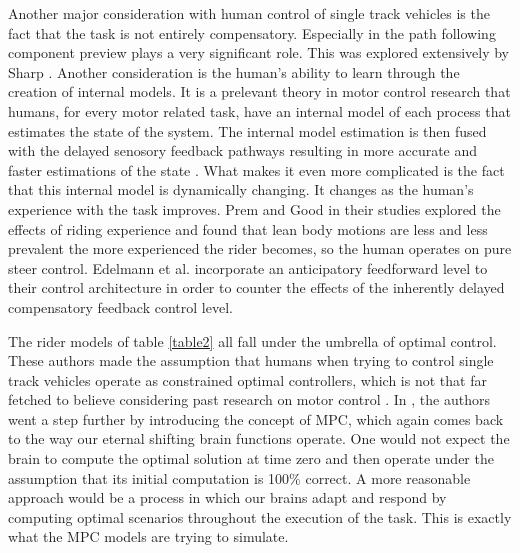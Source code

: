 Another major consideration with human control of single track vehicles is the fact that the task is not entirely compensatory. Especially in the path following component preview plays a very significant role. This was explored extensively by Sharp \cite{sharp2007motorcycle,sharp2006optimal,sharp2008stability,sharp2007optimal,thommyppillai2009advances}. Another consideration is the human's ability to learn through the creation of internal models. It is a prelevant theory in motor control research that humans, for every motor related task, have an internal model of each process that estimates the state of the system. The internal model estimation is then fused with the delayed senosory feedback pathways resulting in more accurate and faster estimations of the state \cite{wolpert1995internal}. What makes it even more complicated is the fact that this internal model is dynamically changing. It changes as the human's experience with the task improves. Prem and Good \cite{prem1984rider} in their studies explored the effects of riding experience and found that lean body motions are less and less prevalent the more experienced the rider becomes, so the human operates on pure steer control. Edelmann et al.\cite{edelmann2015} incorporate an anticipatory feedforward level to their control architecture in order to counter the effects of the inherently delayed compensatory feedback control level.

The rider models of table \ref{table2} all fall under the umbrella of optimal control. These authors made the assumption that humans when trying to control single track vehicles operate as constrained optimal controllers, which is not that far fetched to believe considering past research on motor control \cite{wolpert2007probabilistic}. In \cite{chu2018modelling,massaro2012virtual},  the authors went a step further by  introducing the concept of MPC, which again comes back to the way our eternal shifting brain functions operate. One would not expect the brain to compute the optimal solution at time zero and then operate under the assumption that its initial computation is 100\% correct. A more reasonable approach would be a process in which our brains adapt and respond by computing optimal scenarios throughout the execution of the task. This is exactly what the MPC models are trying to simulate.

